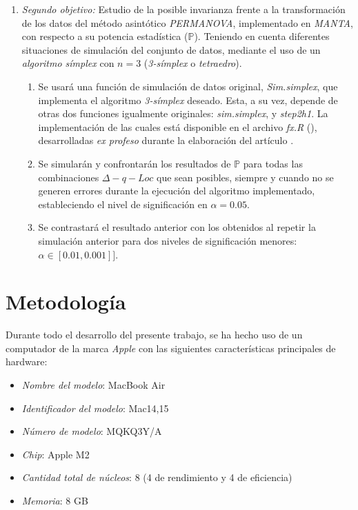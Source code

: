 \documentclass[IB,BIB]{TFUOC}%
\begin{document}
\begin{enumerate}[label=\textnormal{\Roman*.}]
\newpage
\item \label{th2} \textit{Segundo objetivo:} Estudio de la posible invarianza frente a la transformación de los datos del método asintótico \textit{PERMANOVA}, implementado en \textit{MANTA}, con respecto a su potencia estadística (\( \mathbb P \)). Teniendo en cuenta diferentes situaciones de simulación del conjunto de datos, mediante el uso de un \textit{\gls{algoritmo símplex}} con \( n = 3 \) \cite{noauthor_simplex_nodate, noauthor_algoritmo_nodate} (\textit{3-símplex} o \textit{tetraedro}).

   \footnotesize
   \begin{enumerate}[label=\textnormal{(\alph*)}]
   \item Se usará una función de simulación de datos original, \textit{Sim.simplex}, que implementa el algoritmo \textit{3-símplex} deseado. Esta, a su vez, depende de otras dos funciones igualmente originales: \textit{sim.simplex}, y \textit{step2h1}.
La implementación de las cuales está disponible en el archivo \textit{fx.R} (\cite{garrido-martin_manta-sim_2022}), desarrolladas \textit{ex profeso} durante la elaboración del artículo \cite{garrido-martin_fast_2022}.
   \item Se simularán y confrontarán los resultados de \( \mathbb P \) para todas las combinaciones \( \Delta - q - Loc \) que sean posibles, siempre y cuando no se generen errores durante la ejecución del algoritmo implementado, estableciendo el nivel de significación en \( \alpha = \text{0.05} \).
   \item Se contrastará el resultado anterior con los obtenidos al repetir la simulación anterior para dos niveles de significación menores: \( \alpha \in [\text{0.01}, \text{0.001}]] \).
   \end{enumerate}
   \normalsize
   
\end{enumerate}
\normalsize


\section{Metodología}
\label{sec:Metodología}

Durante todo el desarrollo del presente trabajo, se ha hecho uso de un computador de la marca \textit{Apple} con las siguientes características principales de hardware:

\begin{itemize}\raggedright
  \small
  \item \textit{Nombre del modelo}:	MacBook Air
  \item \textit{Identificador del modelo}:	Mac14,15
  \item \textit{Número de modelo}:	MQKQ3Y/A
  \item \textit{Chip}:	Apple M2
  \item \textit{Cantidad total de núcleos}:	8 (4 de rendimiento y 4 de eficiencia)
  \item \textit{Memoria}:	8 GB
  \normalsize
\end{itemize}
\end{document}
